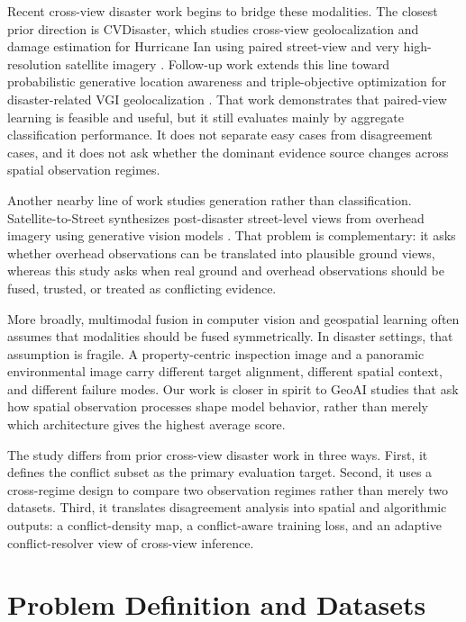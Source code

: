\documentclass[sigconf]{acmart}
\begin{document}
Recent cross-view disaster work begins to bridge these modalities. The closest
prior direction is CVDisaster, which studies cross-view geolocalization and
damage estimation for Hurricane Ian using paired street-view and very
high-resolution satellite imagery \cite{li2025cross}. Follow-up
work extends this line toward probabilistic generative location awareness and
triple-objective optimization for disaster-related VGI geolocalization
\cite{li2026towards,yin2026triple}. That work
demonstrates that paired-view learning is feasible and useful, but it still
evaluates mainly by aggregate classification performance. It does not separate
easy cases from disagreement cases, and it does not ask whether the dominant
evidence source changes across spatial observation regimes.

Another nearby line of work studies generation rather than classification.
Satellite-to-Street synthesizes post-disaster street-level views from overhead
imagery using generative vision models \cite{yang2026satellite}. That problem
is complementary: it asks whether overhead observations can be
translated into plausible ground views, whereas this study asks when real
ground and overhead observations should be fused, trusted, or treated as
conflicting evidence.

More broadly, multimodal fusion in computer vision and geospatial learning
often assumes that modalities should be fused symmetrically. In disaster
settings, that assumption is fragile. A property-centric inspection image and a
panoramic environmental image carry different target alignment, different
spatial context, and different failure modes. Our work is closer in spirit to
GeoAI studies that ask how spatial observation processes shape model behavior,
rather than merely which architecture gives the highest average score.

The study differs from prior cross-view disaster work in three ways. First, it
defines the conflict subset as the primary evaluation target. Second, it uses a
cross-regime design to compare two observation regimes rather than merely two
datasets. Third, it translates disagreement analysis into spatial and
algorithmic outputs: a conflict-density map, a conflict-aware training loss,
and an adaptive conflict-resolver view of cross-view inference.

\section{Problem Definition and Datasets}
\end{document}
